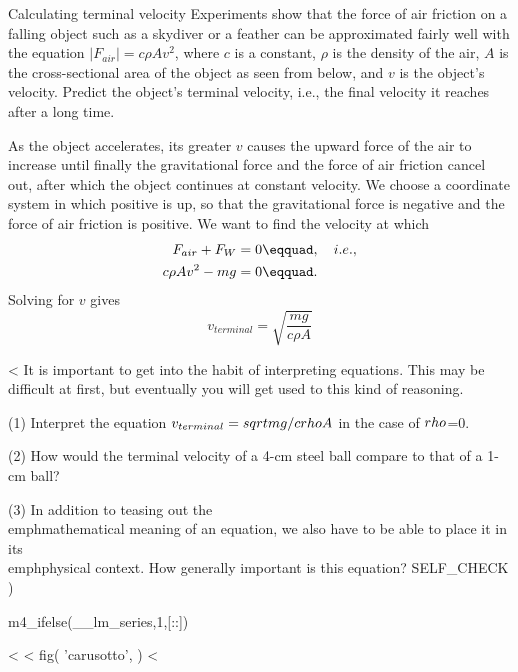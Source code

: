 \begin{eg}{Calculating terminal velocity}
\egquestion Experiments show that the force of air friction on
a falling object such as a skydiver or a feather can be
approximated fairly well with the equation 
$|F_{air}|=c\rho Av^2$, where $c$ is a constant, $\rho$ is the density of the
air, $A$ is the cross-sectional area of the object as seen
from below, and $v$ is the object's velocity. Predict the
object's terminal velocity, i.e., the final velocity it
reaches after a long time.

\eganswer As the object accelerates, its greater $v$ causes
the upward force of the air to increase until finally the
gravitational force and the force of air friction cancel
out, after which the object continues at constant velocity.
We choose a coordinate system in which positive is up, so
that the gravitational force is negative and the force of
air friction is positive. We want to find the velocity at which
\begin{align*}
        F_{air}+ F_W     &=     0\eqquad, \quad i.e.,  \\
        c\rho Av ^2- mg     &=     0\eqquad.
\end{align*}
Solving for $v$ gives
\begin{equation*}
        v_{terminal}  = \sqrt{\frac{mg}{c\rho A}}
\end{equation*}
\end{eg}

<%
It is important to get into the habit of interpreting
equations. This may be difficult at first,
but eventually you will get used to this kind of reasoning.

(1) Interpret the equation $v_{terminal}=\\sqrt{mg/c\\rho A}$ in the case of $\\rho $=0.

(2) How would the terminal velocity of a 4-cm steel ball
compare to that of a 1-cm ball?

(3) In addition to teasing out the \\emph{mathematical} meaning of
an equation, we also have to be able to place it in its \\emph{physical}
context. How generally important is this equation?
  SELF_CHECK
  ) %

m4_ifelse(__lm_series,1,[:\pagebreak[4]:])

<%
<%
  fig(
    'carusotto',
  )
<%

